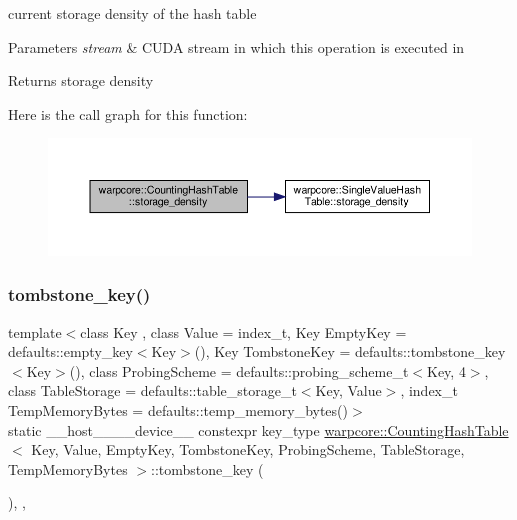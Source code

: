 current storage density of the hash table 


\begin{DoxyParams}{Parameters}
{\em stream} & C\+U\+DA stream in which this operation is executed in \\
\hline
\end{DoxyParams}
\begin{DoxyReturn}{Returns}
storage density 
\end{DoxyReturn}
Here is the call graph for this function\+:
\nopagebreak
\begin{figure}[H]
\begin{center}
\leavevmode
\includegraphics[width=350pt]{classwarpcore_1_1CountingHashTable_a8ffc638d6747fdb66cfa9500e46f705c_cgraph}
\end{center}
\end{figure}
\mbox{\label{classwarpcore_1_1CountingHashTable_a8b7932f1bb07c36dbcdfc383eb89548e}} 
\subsubsection{\texorpdfstring{tombstone\+\_\+key()}{tombstone\_key()}}
{\footnotesize\ttfamily template$<$class Key , class Value  = index\+\_\+t, Key Empty\+Key = defaults\+::empty\+\_\+key$<$\+Key$>$(), Key Tombstone\+Key = defaults\+::tombstone\+\_\+key$<$\+Key$>$(), class Probing\+Scheme  = defaults\+::probing\+\_\+scheme\+\_\+t$<$\+Key, 4$>$, class Table\+Storage  = defaults\+::table\+\_\+storage\+\_\+t$<$\+Key, Value$>$, index\+\_\+t Temp\+Memory\+Bytes = defaults\+::temp\+\_\+memory\+\_\+bytes()$>$ \\
static \+\_\+\+\_\+host\+\_\+\+\_\+\+\_\+\+\_\+device\+\_\+\+\_\+ constexpr key\+\_\+type \hyperlink{classwarpcore_1_1CountingHashTable}{warpcore\+::\+Counting\+Hash\+Table}$<$ Key, Value, Empty\+Key, Tombstone\+Key, Probing\+Scheme, Table\+Storage, Temp\+Memory\+Bytes $>$\+::tombstone\+\_\+key (\begin{DoxyParamCaption}{ }\end{DoxyParamCaption})\hspace{0.3cm}{\ttfamily [inline]}, {\ttfamily [static]}, {\ttfamily [noexcept]}}



